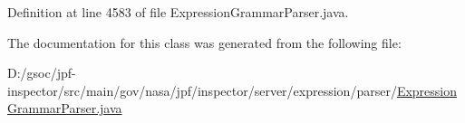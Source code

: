 Definition at line 4583 of file Expression\+Grammar\+Parser.\+java.



The documentation for this class was generated from the following file\+:\begin{DoxyCompactItemize}
\item 
D\+:/gsoc/jpf-\/inspector/src/main/gov/nasa/jpf/inspector/server/expression/parser/\hyperlink{_expression_grammar_parser_8java}{Expression\+Grammar\+Parser.\+java}\end{DoxyCompactItemize}
